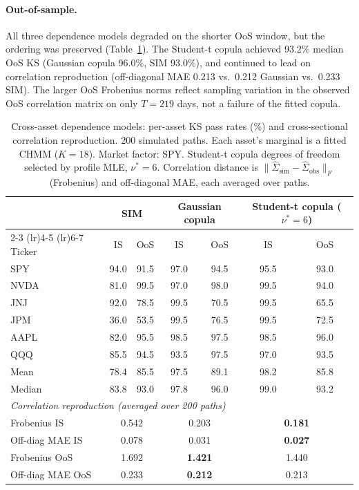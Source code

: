 \paragraph{Out-of-sample.}
All three dependence models degraded on the shorter OoS window, but the ordering was preserved (Table~\ref{tab:cross_asset_sim_copula}).
The Student-t copula achieved 93.2\% median OoS KS (Gaussian copula 96.0\%, SIM 93.0\%), and continued to lead on correlation reproduction (off-diagonal MAE 0.213 vs.\ 0.212 Gaussian vs.\ 0.233 SIM).
The larger OoS Frobenius norms reflect sampling variation in the observed OoS correlation matrix on only $T = 219$ days, not a failure of the fitted copula.

\begin{table}[t]
\centering
\caption{Cross-asset dependence models: per-asset KS pass rates (\%) and cross-sectional correlation reproduction. 200 simulated paths. Each asset's marginal is a fitted CHMM ($K = 18$). Market factor: SPY. Student-t copula degrees of freedom selected by profile MLE, $\nu^* = 6$. Correlation distance is $\|\hat{\Sigma}_{\text{sim}} - \hat{\Sigma}_{\text{obs}}\|_F$ (Frobenius) and off-diagonal MAE, each averaged over paths.}
\label{tab:cross_asset_sim_copula}
\small
\begin{tabular}{l cc cc cc}
\toprule
& \multicolumn{2}{c}{SIM} & \multicolumn{2}{c}{Gaussian copula} & \multicolumn{2}{c}{Student-t copula ($\nu^* = 6$)} \\
\cmidrule(lr){2-3} \cmidrule(lr){4-5} \cmidrule(lr){6-7}
Ticker & IS & OoS & IS & OoS & IS & OoS \\
\midrule
SPY   & 94.0 & 91.5 & 97.0 & 94.5 & 95.5  & 93.0 \\
NVDA  & 81.0 & 99.5 & 97.0 & 98.0 & 99.5  & 94.0 \\
JNJ   & 92.0 & 78.5 & 99.5 & 70.5 & 99.5  & 65.5 \\
JPM   & 36.0 & 53.5 & 99.5 & 76.5 & 99.5  & 72.5 \\
AAPL  & 82.0 & 95.5 & 98.5 & 97.5 & 98.5  & 96.0 \\
QQQ   & 85.5 & 94.5 & 93.5 & 97.5 & 97.0  & 93.5 \\
\midrule
Mean   & 78.4 & 85.5 & 97.5 & 89.1 & 98.2 & 85.8 \\
Median & 83.8 & 93.0 & 97.8 & 96.0 & 99.0 & 93.2 \\
\midrule
\multicolumn{7}{l}{\textit{Correlation reproduction (averaged over 200 paths)}} \\
Frobenius IS         & \multicolumn{2}{c}{0.542} & \multicolumn{2}{c}{0.203} & \multicolumn{2}{c}{\textbf{0.181}} \\
Off-diag MAE IS      & \multicolumn{2}{c}{0.078} & \multicolumn{2}{c}{0.031} & \multicolumn{2}{c}{\textbf{0.027}} \\
Frobenius OoS        & \multicolumn{2}{c}{1.692} & \multicolumn{2}{c}{\textbf{1.421}} & \multicolumn{2}{c}{1.440} \\
Off-diag MAE OoS     & \multicolumn{2}{c}{0.233} & \multicolumn{2}{c}{\textbf{0.212}} & \multicolumn{2}{c}{0.213} \\
\bottomrule
\end{tabular}
\end{table}

